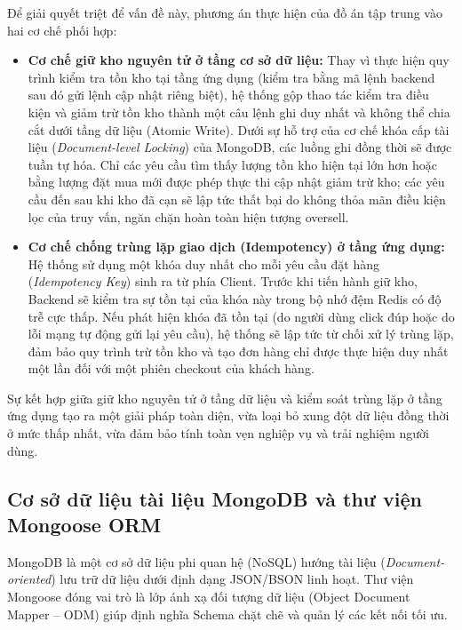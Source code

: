 \documentclass[../DoAn.tex]{subfiles}
\begin{document}
Để giải quyết triệt để vấn đề này, phương án thực hiện của đồ án tập trung vào hai cơ chế phối hợp:
\begin{itemize}
    \item \textbf{Cơ chế giữ kho nguyên tử ở tầng cơ sở dữ liệu:} Thay vì thực hiện quy trình kiểm tra tồn kho tại tầng ứng dụng (kiểm tra bằng mã lệnh backend sau đó gửi lệnh cập nhật riêng biệt), hệ thống gộp thao tác kiểm tra điều kiện và giảm trừ tồn kho thành một câu lệnh ghi duy nhất và không thể chia cắt dưới tầng dữ liệu (Atomic Write). Dưới sự hỗ trợ của cơ chế khóa cấp tài liệu (\textit{Document-level Locking}) của MongoDB, các luồng ghi đồng thời sẽ được tuần tự hóa. Chỉ các yêu cầu tìm thấy lượng tồn kho hiện tại lớn hơn hoặc bằng lượng đặt mua mới được phép thực thi cập nhật giảm trừ kho; các yêu cầu đến sau khi kho đã cạn sẽ lập tức thất bại do không thỏa mãn điều kiện lọc của truy vấn, ngăn chặn hoàn toàn hiện tượng oversell.
    \item \textbf{Cơ chế chống trùng lặp giao dịch (Idempotency) ở tầng ứng dụng:} Hệ thống sử dụng một khóa duy nhất cho mỗi yêu cầu đặt hàng (\textit{Idempotency Key}) sinh ra từ phía Client. Trước khi tiến hành giữ kho, Backend sẽ kiểm tra sự tồn tại của khóa này trong bộ nhớ đệm Redis có độ trễ cực thấp. Nếu phát hiện khóa đã tồn tại (do người dùng click đúp hoặc do lỗi mạng tự động gửi lại yêu cầu), hệ thống sẽ lập tức từ chối xử lý trùng lặp, đảm bảo quy trình trừ tồn kho và tạo đơn hàng chỉ được thực hiện duy nhất một lần đối với một phiên checkout của khách hàng.
\end{itemize}
Sự kết hợp giữa giữ kho nguyên tử ở tầng dữ liệu và kiểm soát trùng lặp ở tầng ứng dụng tạo ra một giải pháp toàn diện, vừa loại bỏ xung đột dữ liệu đồng thời ở mức thấp nhất, vừa đảm bảo tính toàn vẹn nghiệp vụ và trải nghiệm người dùng.

\subsection{Cơ sở dữ liệu tài liệu MongoDB và thư viện Mongoose ORM}
MongoDB là một cơ sở dữ liệu phi quan hệ (NoSQL) hướng tài liệu (\textit{Document-oriented}) lưu trữ dữ liệu dưới định dạng JSON/BSON linh hoạt. Thư viện Mongoose đóng vai trò là lớp ánh xạ đối tượng dữ liệu (Object Document Mapper -- ODM) giúp định nghĩa Schema chặt chẽ và quản lý các kết nối tối ưu.
\end{document}
